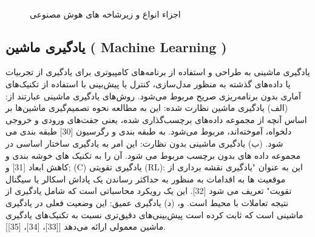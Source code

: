 \documentclass[towcolumn, 11pt]{Article}
\begin{document}
\begin{چکیده}
\begin{figure}[h]
\centering
\includegraphics[width=1.1, height=0/96\linewidth]{Images/Artificial Intelligence.jpg}
\caption{اجزاء انواع و زیرشاخه های هوش مصنوعی}
\label{شکل:Artificial Intelligence}
\end{figure}


\subsection{یادگیری ماشین ( Machine Learning )}
یادگیری ماشینی به طراحی و استفاده از برنامه‌های کامپیوتری برای یادگیری از تجربیات یا داده‌های گذشته به منظور مدل‌سازی، کنترل یا پیش‌بینی با استفاده از تکنیک‌های آماری بدون برنامه‌ریزی صریح مربوط می‌شود. روش‌های یادگیری ماشینی عبارتند از: (الف) یادگیری ماشین نظارت شده: این به مطالعه نحوه تصمیم‌گیری ماشین‌ها بر اساس آنچه از مجموعه داده‌های برچسب‌گذاری شده، یعنی جفت‌های ورودی و خروجی دلخواه، آموخته‌اند، مربوط می‌شود. به طبقه بندی و رگرسیون [30] طبقه بندی می شود. (ب) یادگیری ماشینی بدون نظارت: این امر به یادگیری ساختار اساسی در مجموعه داده های بدون برچسب مربوط می شود. آن را به تکنیک های خوشه بندی و کاهش ابعاد [31] و; (C) یادگیری تقویتی (RL): این به عنوان "یادگیری نقشه برداری از موقعیت ها به اقدامات به منظور به حداکثر رساندن یک پاداش اسکالر یا سیگنال تقویت" تعریف می شود [32]. این یک رویکرد محاسباتی است که شامل یادگیری از نتیجه تعاملات با محیط است. و، (د) یادگیری عمیق: این وضعیت فعلی در یادگیری ماشینی است که ثابت کرده است پیش‌بینی‌های دقیق‌تری نسبت به تکنیک‌های یادگیری ماشین معمولی ارائه می‌دهد [[33]، [34]، [35]].


\end{چکیده}
\end{document}

